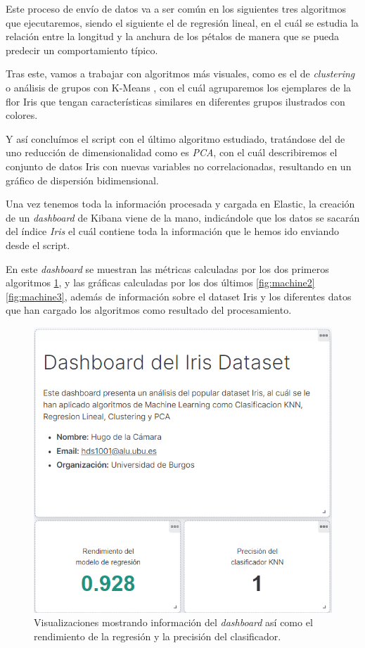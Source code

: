 Este proceso de envío de datos va a ser común en los siguientes tres algoritmos que ejecutaremos, siendo el siguiente el de regresión lineal\cite{regresion}, en el cuál se estudia la relación entre la longitud y la anchura de los pétalos de manera que se pueda predecir un comportamiento típico. 

Tras este, vamos a trabajar con algoritmos más visuales, como es el de \textit{clustering} o análisis de grupos con K-Means\cite{clustering} , con el cuál agruparemos los ejemplares de la flor Iris que tengan características similares en diferentes grupos ilustrados con colores. 

Y así concluímos el script con el último algoritmo estudiado, tratándose del de uno reducción de dimensionalidad como es \textit{PCA}\cite{pca}, con el cuál describiremos el conjunto de datos Iris con nuevas variables no correlacionadas, resultando en un gráfico de dispersión bidimensional.

Una vez tenemos toda la información procesada y cargada en Elastic, la creación de un \textit{dashboard} de Kibana viene de la mano, indicándole que los datos se sacarán del índice \textit{Iris} el cuál contiene toda la información que le hemos ido enviando desde el script.

En este \textit{dashboard} se muestran las métricas calculadas por los dos primeros algoritmos \ref{fig:machine1}, y las gráficas calculadas por los dos últimos \ref{fig:machine2} \ref{fig:machine3}, además de información sobre el dataset Iris y los diferentes datos que han cargado los algoritmos como resultado del procesamiento.

\begin{figure}
    \centering
    \includegraphics[width=1\linewidth]{img/iris12.png}
    \caption{Visualizaciones mostrando información del \textit{dashboard} así como el rendimiento de la regresión y la precisión del clasificador.}
    \label{fig:machine1}
\end{figure}


